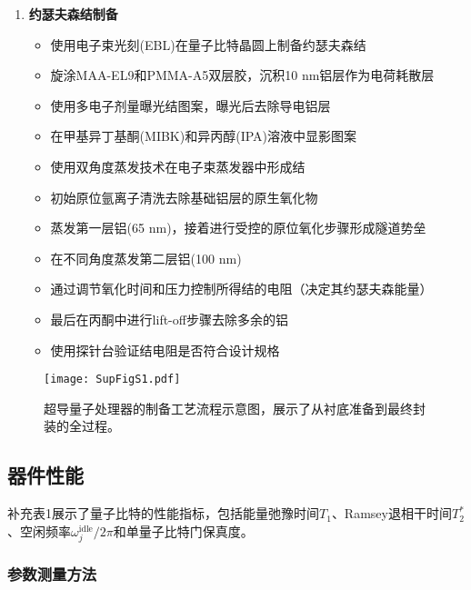 \documentclass[11pt,a4paper]{article}
\begin{document}
\begin{enumerate}
    \item \textbf{约瑟夫森结制备}
    \begin{itemize}
        \item 使用电子束光刻(EBL)在量子比特晶圆上制备约瑟夫森结
        \item 旋涂MAA-EL9和PMMA-A5双层胶，沉积10 nm铝层作为电荷耗散层
        \item 使用多电子剂量曝光结图案，曝光后去除导电铝层
        \item 在甲基异丁基酮(MIBK)和异丙醇(IPA)溶液中显影图案
        \item 使用双角度蒸发技术在电子束蒸发器中形成结
        \item 初始原位氩离子清洗去除基础铝层的原生氧化物
        \item 蒸发第一层铝(65 nm)，接着进行受控的原位氧化步骤形成隧道势垒
        \item 在不同角度蒸发第二层铝(100 nm)
        \item 通过调节氧化时间和压力控制所得结的电阻（决定其约瑟夫森能量）
        \item 最后在丙酮中进行lift-off步骤去除多余的铝
        \item 使用探针台验证结电阻是否符合设计规格
    \end{itemize}
\end{enumerate}

\begin{figure}[H]
    \centering
    \texttt{[image: SupFigS1.pdf]}
    \caption{超导量子处理器的制备工艺流程示意图，展示了从衬底准备到最终封装的全过程。}
    \label{fig:fabrication_process}
\end{figure}

\subsection{器件性能}

补充表1展示了量子比特的性能指标，包括能量弛豫时间$T_1$、Ramsey退相干时间$T_2^*$、空闲频率$\omega_j^{\text{idle}}/2\pi$和单量子比特门保真度。

\subsubsection{参数测量方法}
\end{document}

